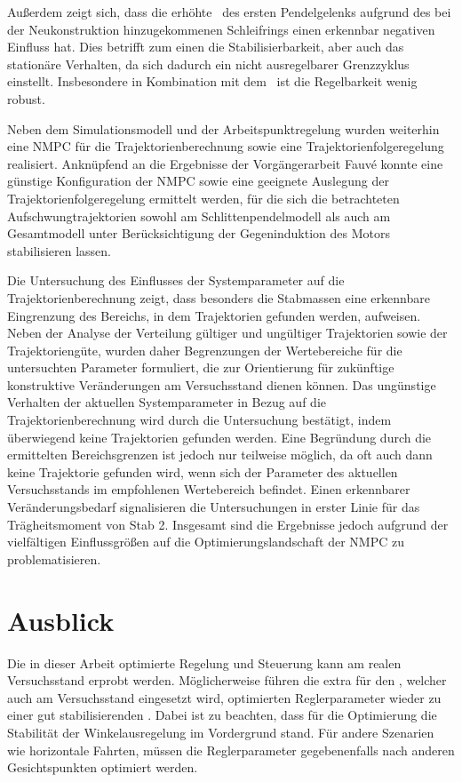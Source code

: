Außerdem zeigt sich, dass die erhöhte \crb\ des ersten Pendelgelenks aufgrund des bei der Neukonstruktion hinzugekommenen Schleifrings einen erkennbar negativen Einfluss hat.
Dies betrifft zum einen die Stabilisierbarkeit, aber auch das stationäre Verhalten, da sich dadurch ein nicht ausregelbarer Grenzzyklus einstellt.
Insbesondere in Kombination mit dem \beob\ ist die Regelbarkeit wenig robust.

Neben dem Simulationsmodell und der Arbeitspunktregelung wurden weiterhin eine NMPC für die Trajektorienberechnung sowie eine Trajektorienfolgeregelung realisiert. Anknüpfend an die Ergebnisse der Vorgängerarbeit Fauvé \cite{fauve} konnte eine günstige Konfiguration der NMPC sowie eine geeignete Auslegung der Trajektorienfolgeregelung ermittelt werden, für die sich die betrachteten Aufschwungtrajektorien sowohl am Schlittenpendelmodell als auch am Gesamtmodell unter Berücksichtigung der Gegeninduktion des Motors stabilisieren lassen.

Die Untersuchung des Einflusses der Systemparameter auf die Trajektorienberechnung zeigt, dass besonders die Stabmassen eine erkennbare Eingrenzung des Bereichs, in dem Trajektorien gefunden werden, aufweisen. Neben der Analyse der Verteilung gültiger und ungültiger Trajektorien sowie der Trajektoriengüte, wurden daher Begrenzungen der Wertebereiche für die untersuchten Parameter formuliert, die zur Orientierung für zukünftige konstruktive Veränderungen am Versuchsstand dienen können. Das ungünstige Verhalten der aktuellen Systemparameter in Bezug auf die Trajektorienberechnung wird durch die Untersuchung bestätigt, indem überwiegend keine Trajektorien gefunden werden. Eine Begründung durch die ermittelten Bereichsgrenzen ist jedoch nur teilweise möglich, da oft auch dann keine Trajektorie gefunden wird, wenn sich der Parameter des aktuellen Versuchsstands im empfohlenen Wertebereich befindet. Einen erkennbarer Veränderungsbedarf signalisieren die Untersuchungen in erster Linie für das Trägheitsmoment von Stab 2. Insgesamt sind die Ergebnisse jedoch aufgrund der vielfältigen Einflussgrößen auf die Optimierungslandschaft der NMPC zu problematisieren.

  

\section{Ausblick}

Die in dieser Arbeit optimierte Regelung und Steuerung kann am realen Versuchsstand erprobt werden.
Möglicherweise führen die extra für den \beob, welcher auch am Versuchsstand eingesetzt wird, optimierten Reglerparameter wieder zu einer gut stabilisierenden \aprg.
Dabei ist zu beachten, dass für die Optimierung die Stabilität der Winkelausregelung im Vordergrund stand.
Für andere Szenarien wie horizontale Fahrten, müssen die Reglerparameter gegebenenfalls nach anderen Gesichtspunkten optimiert werden.

